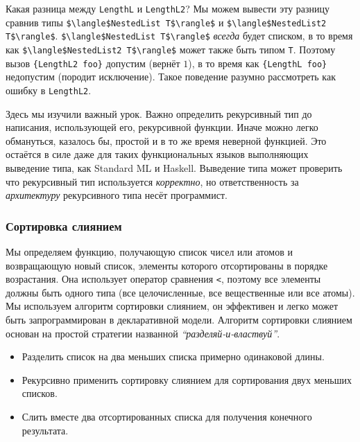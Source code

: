 Какая разница между \lstinline!LengthL! и \lstinline!LengthL2!? Мы можем вывести эту разницу сравнив типы \lstinline!$\langle$NestedList T$\rangle$! и \lstinline!$\langle$NestedList2 T$\rangle$!. \lstinline!$\langle$NestedList T$\rangle$! \emph{всегда} будет списком, в то время как \lstinline!$\langle$NestedList2 T$\rangle$! может также быть типом \lstinline!T!. Поэтому вызов \lstinline!{LengthL2 foo}! допустим (вернёт $1$), в то время как \lstinline!{LengthL foo}! недопустим (породит исключение). Такое поведение разумно рассмотреть как ошибку в \lstinline!LengthL2!.

Здесь мы изучили важный урок. Важно определить рекурсивный тип до написания, использующей его, рекурсивной функции. Иначе можно легко обмануться, казалось бы, простой и в то же время неверной функцией. Это остаётся в силе даже для таких функциональных языков выполняющих выведение типа, как Standard ML и Haskell. Выведение типа может проверить что рекурсивный тип используется \emph{корректно}, но ответственность за \emph{архитектуру} рекурсивного типа несёт программист.

\subsubsection{Сортировка слиянием}

Мы определяем функцию, получающую список чисел или атомов и возвращающую новый список, элементы которого отсортированы в порядке возрастания. Она использует оператор сравнения \lstinline!<!, поэтому все элементы должны быть одного типа (все целочисленные, все вещественные или все атомы). Мы используем алгоритм сортировки слиянием, он эффективен и легко может быть запрограммирован в декларативной модели. Алгоритм сортировки слиянием основан на простой стратегии названной \emph{``разделяй-и-властвуй''}.

\begin{itemize}
\item{Разделить список на два меньших списка примерно одинаковой длины.}

\item{Рекурсивно применить сортировку слиянием для сортирования двух меньших списков.}

\item{Слить вместе два отсортированных списка для получения конечного результата.}
\end{itemize}

